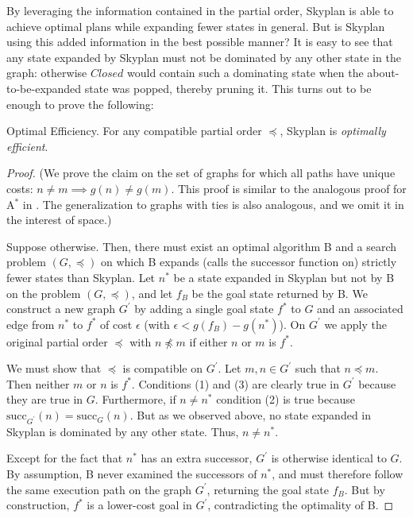 \documentclass[letterpaper]{article}
\theoremstyle{plain} \newtheorem{theorem}{Theorem} \newtheorem{proposition}{Proposition} \newtheorem{lemma}{Lemma}
\theoremstyle{definition} \newtheorem{definition}{Definition} \newtheorem{conjecture}{Conjecture} \newtheorem*{example}{Example}
\theoremstyle{remark} \newtheorem*{remark}{Remark} \newtheorem*{note}{Note} \newtheorem{case}{Case}
\newcommand{\Astar}{A$^*$ }
\begin{document}
By leveraging the information contained in the partial order, Skyplan is able to achieve
optimal plans while expanding fewer states in general.  But is Skyplan using this added
information in the best possible manner? It is easy to see that any state expanded by 
Skyplan must not be dominated by any other state in the graph: otherwise $Closed$ would
contain such a dominating state when the about-to-be-expanded
state was popped, thereby pruning it.  This turns out to be
enough to prove the following:

\begin{claim}{Optimal Efficiency.}\label{clm-optimally-efficient}
For any compatible partial order $\preceq$, Skyplan is \emph{optimally efficient}.
\end{claim}
\begin{proof} 
(We prove the claim on the set of graphs for which all paths have unique costs: $n \neq m \implies g(n) \neq g(m)$. This proof
is similar to the analogous proof for \Astar in \citet{holte1996hierarchical}. The generalization to graphs with
ties is also analogous, and we omit it in the interest of space.)

Suppose otherwise. Then, there must exist an optimal algorithm B and a search problem $(G,\preceq)$ 
on which B expands (calls the successor function on) strictly fewer states than Skyplan. 
Let $n^{*}$ be a state expanded in Skyplan but not by B on the problem $(G,\preceq)$, and let
$f_{B}$ be the goal state returned by B. We construct a new graph $G^\prime$ by adding a single goal state $f^*$ to $G$ 
and an associated edge from $n^*$ to $f^*$ of cost $\epsilon$ (with $\epsilon < g(f_B)-g(n^*)$). 
On $G^\prime$ we apply the original partial order $\preceq$ with $n \npreceq m$ if either $n$ or $m$ is $f^*$.

We must show that $\preceq$ is compatible on $G^\prime$. 
Let $m,n \in G^\prime$ such that $n \preceq m$. Then neither $m$ or $n$ is $f^*$. Conditions (1) and (3) %
are clearly true in $G^\prime$ because they are true in $G$.  Furthermore, if $n \neq n^*$ condition (2) is true 
because $\mathrm{succ}_{G^\prime}(n) = \mathrm{succ}_{G}(n)$. 
But as we observed above, no state expanded in Skyplan is
dominated by any other state. Thus, $n \neq n^*$.

Except for the fact that $n^*$ has an extra successor, $G^\prime$ is otherwise
 identical to $G$. By assumption, B never examined the successors of $n^*$, and 
must therefore follow the same execution path on the graph $G^\prime$, returning the goal state $f_B$.
But by construction, $f^*$ is a lower-cost goal in $G^\prime$, contradicting the optimality of B.
 \end{proof}
\end{document}
